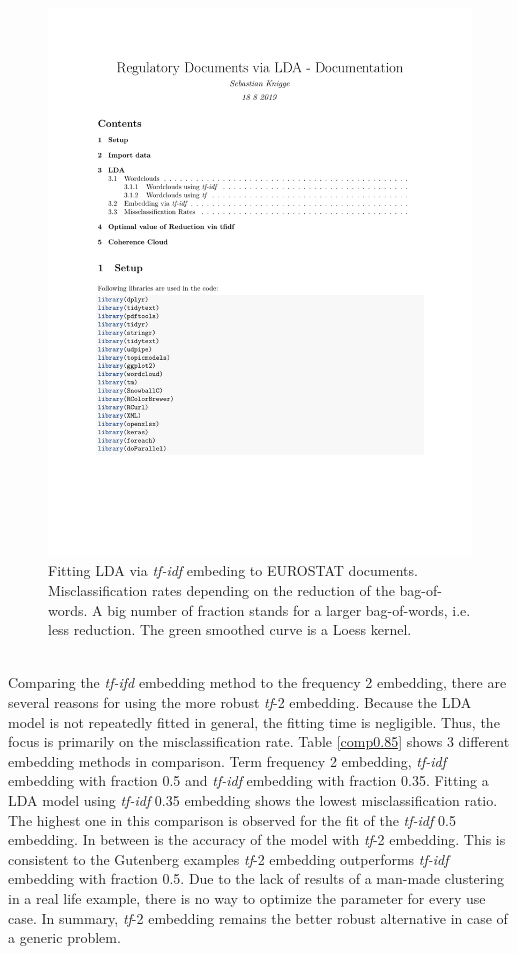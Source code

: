 \documentclass[11pt,a4paper]{article}
\begin{document}
\begin{figure}[!htbp]
	\centering
	\includegraphics[page=21, trim=68 400 10 70,clip,width=1.2\textwidth]{Docs_LDA_adapted.pdf}
	\caption{Fitting LDA via \textit{tf-idf} embeding to EUROSTAT documents. Misclassification rates depending on the reduction of the bag-of-words. A big number of fraction stands for a larger bag-of-words, i.e. less reduction. The green smoothed curve is a Loess kernel.}
	\label{misc.ratio_tfidf}
\end{figure}
\ \\
Comparing the \textit{tf-ifd} embedding method to the frequency 2 embedding, there are several reasons for using the more robust \textit{tf}-2 embedding. Because the LDA model is not repeatedly fitted in general, the fitting time is negligible. Thus, the focus is primarily on the misclassification rate. Table \ref{comp0.85} shows 3 different embedding methods in comparison. Term frequency 2 embedding, \textit{tf-idf} embedding with fraction 0.5 and \textit{tf-idf} embedding with fraction 0.35. Fitting a LDA model using \textit{tf-idf} 0.35 embedding shows the lowest misclassification ratio. The highest one in this comparison is observed for the fit of the \textit{tf-idf} 0.5 embedding. In between is the accuracy of the model with \textit{tf}-2 embedding. This is consistent to the Gutenberg examples \textit{tf}-2 embedding outperforms \textit{tf-idf} embedding with fraction 0.5. Due to the lack of results of a man-made clustering in a real life example, there is no way to optimize the parameter for every use case. In summary, \textit{tf}-2 embedding remains the better robust alternative in case of a generic problem.
\end{document}
